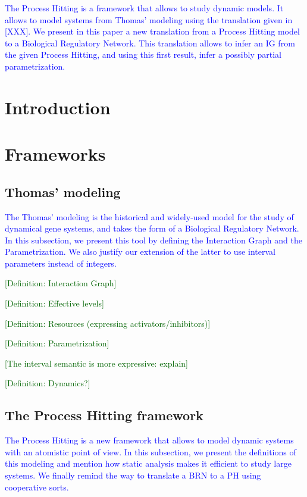 \documentclass[fleqn]{llncs}
\newcommand{\resume}[1]{\textcolor{blue}{#1}}
\newcommand{\todo}[1]{\textcolor{darkgreen}{[#1]}}
\begin{document}
\resume{The Process Hitting is a framework that allows to study dynamic models. It allows to model systems from Thomas' modeling using the translation given in [XXX]. We present in this paper a new translation from a Process Hitting model to a Biological Regulatory Network. This translation allows to infer an IG from the given Process Hitting, and using this first result, infer a possibly partial parametrization.}

\section{Introduction}



\section{Frameworks}

\subsection{Thomas' modeling}
\resume{The Thomas' modeling is the historical and widely-used model for the study of dynamical gene systems, and takes the form of a Biological Regulatory Network. In this subsection, we present this tool by defining the Interaction Graph and the Parametrization. We also justify our extension of the latter to use interval parameters instead of integers.}

\todo{Definition: Interaction Graph}

\todo{Definition: Effective levels}

\todo{Definition: Resources (expressing activators/inhibitors)}

\todo{Definition: Parametrization}

\todo{The interval semantic is more expressive: explain}

\todo{Definition: Dynamics?}

\subsection{The Process Hitting framework}
\resume{The Process Hitting is a new framework that allows to model dynamic systems with an atomistic point of view. In this subsection, we present the definitions of this modeling and mention how static analysis makes it efficient to study large systems. We finally remind the way to translate a BRN to a PH using cooperative sorts.}
\end{document}
